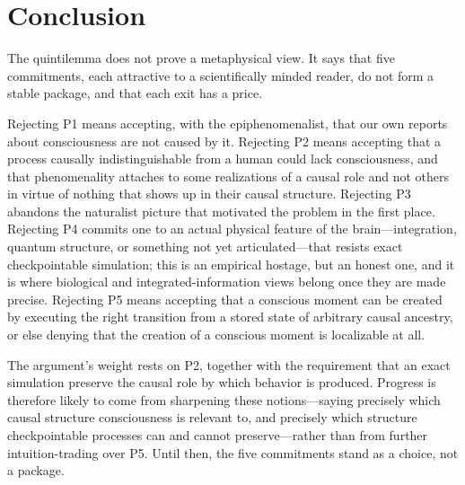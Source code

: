 \documentclass[11pt]{article}
\begin{document}
\section{Conclusion}

The quintilemma does not prove a metaphysical view. It says that five
commitments, each attractive to a scientifically minded reader, do not form a
stable package, and that each exit has a price.

Rejecting P1 means accepting, with the epiphenomenalist, that our own reports
about consciousness are not caused by it. Rejecting P2 means accepting that a
process causally indistinguishable from a human could lack consciousness, and
that phenomenality attaches to some realizations of a causal role and not
others in virtue of nothing that shows up in their causal structure. Rejecting
P3 abandons the naturalist picture that motivated the problem in the first
place. Rejecting P4 commits one to an actual physical feature of the
brain---integration, quantum structure, or something not yet articulated---that
resists exact checkpointable simulation; this is an empirical hostage, but an
honest one, and it is where biological and integrated-information views belong
once they are made precise. Rejecting P5 means accepting that a conscious
moment can be created by executing the right transition from a stored state of
arbitrary causal ancestry, or else denying that the creation of a conscious
moment is localizable at all.

The argument's weight rests on P2, together with the requirement that an exact
simulation preserve the causal role by which behavior is produced. Progress is
therefore likely to come from sharpening these notions---saying precisely
which causal structure consciousness is relevant to, and precisely which
structure checkpointable processes can and cannot preserve---rather than from
further intuition-trading over P5. Until then, the five commitments stand as a
choice, not a package.
\end{document}
